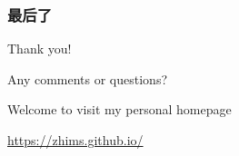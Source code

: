 \documentclass[aspectratio=2516]{beamer}
\begin{document}

\begin{frame}
\frametitle{\kaishu 最后了}
\begin{center}
	{\Huge Thank you!}
	
	\vspace{1cm}
	
	{\Huge Any comments or questions?}
	
	\vspace{2.25cm}	
	
  {\tiny Welcome to visit my personal homepage}	
  	
  {	\tiny {\color{blue} \url{https://zhims.github.io/}}}
\end{center}
\end{frame}

\end{document}
